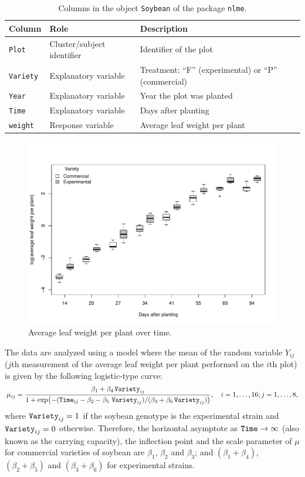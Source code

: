 \begin{table}[!ht]
{\small
\begin{center}
\begin{tabular}{lll} 
 \hline
Column &  Role   &  Description\\ \hline
{\tt Plot}  & Cluster/subject identifier & Identifier of the plot\\
{\tt Variety} & Explanatory variable & Treatment: ``F'' (experimental) or ``P'' (commercial)\\
{\tt Year} & Explanatory variable & Year the plot was planted\\
{\tt Time} & Explanatory variable & Days after planting\\
{\tt weight} & Response variable& Average leaf weight per plant\\ 
 \hline
\end{tabular}
\end{center}
\caption{Columns in the object {\tt Soybean} of the package {\tt nlme}.}
\label{Soy}}
\end{table}

\begin{figure}[h!]
\centering
\includegraphics[width=\textwidth]{soybean}
\caption{Average leaf weight per plant over time.}
\label{sg}
\end{figure}

The data are analyzed using a model where the mean of the random variable $Y_{ij}$ ($j$th measurement of the average leaf weight per plant performed on the $i$th plot) is given by the following logistic-type curve:
$$\mu_{ij}=\dfrac{\beta_1+\beta_4\,\text{\tt Variety}_{ij}}{1+\exp\!\left(-(\text{\tt Time}_{ij}-\beta_2-\beta_5\,\,\text{\tt Variety}_{ij})/(\beta_3+\beta_6\,\text{\tt Variety}_{ij})\right)}, \quad i=1,\ldots,16;j=1,\ldots,8,$$
where ${\tt Variety}_{ij}=1$ if the soybean genotype is the experimental strain and ${\tt Variety}_{ij}=0$ otherwise. Therefore, the horizontal asymptote as $\text{\tt Time}\to \infty$ (also known as the carrying capacity), the inflection point and the scale parameter of $\mu$ for commercial varieties of soybean are $\beta_1$, $\beta_2$ and $\beta_3$; and $(\beta_1+\beta_4)$, $(\beta_2+\beta_5)$ and $(\beta_3+\beta_6)$ for experimental strains.

